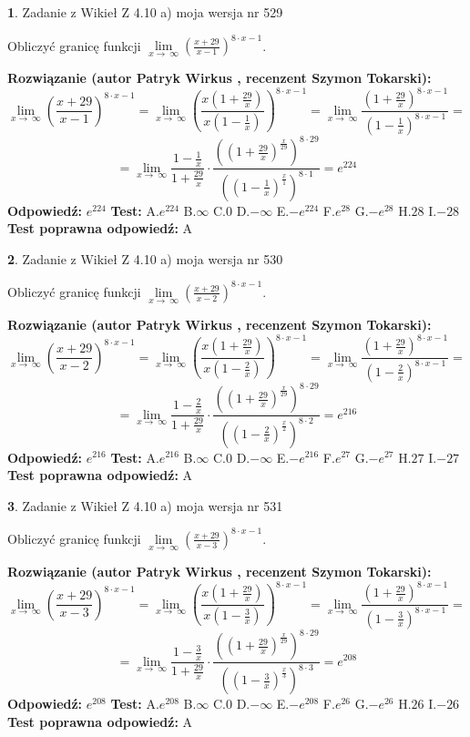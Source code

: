 \documentclass[12pt, a4paper]{article}
\theoremstyle{definition} %
\newtheorem{zad}{}
\newcommand{\zadStart}[1]{\begin{zad}#1\newline}
\newcommand{\zadStop}{\end{zad}}
\newcommand{\rozwStart}[2]{\noindent \textbf{Rozwiązanie (autor #1 , recenzent #2): }\newline}
\newcommand{\rozwStop}{\newline}
\newcommand{\odpStart}{\noindent \textbf{Odpowiedź:}\newline}
\newcommand{\odpStop}{\newline}
\newcommand{\testStart}{\noindent \textbf{Test:}\newline}
\newcommand{\testStop}{\newline}
\newcommand{\kluczStart}{\noindent \textbf{Test poprawna odpowiedź:}\newline}
\newcommand{\kluczStop}{\newline}
\begin{document}
\zadStart{Zadanie z Wikieł Z 4.10 a) moja wersja nr 529}

Obliczyć granicę funkcji  $\lim\limits_{x\to\ \infty}(\frac{x+29}{x-1})^{8\cdot x-1}$.
\zadStop
\rozwStart{Patryk Wirkus}{Szymon Tokarski}
$$\lim\limits_{x\to\ \infty}(\frac{x+29}{x-1})^{8\cdot x-1} = \lim\limits_{x\to\ \infty}(\frac{x(1+\frac{29}{x})}{x(1-\frac{1}{x})})^{8\cdot x-1}=\lim\limits_{x\to\ \infty}\frac{(1+\frac{29}{x})^{8\cdot x-1}}{(1-\frac{1}{x})^{8\cdot x-1}}=$$
$$=\lim\limits_{x\to\ \infty}\frac{1-\frac{1}{x}}{1+\frac{29}{x}}\cdot\frac{((1+\frac{29}{x})^{\frac{x}{29}})^{8\cdot29}}{((1-\frac{1}{x})^{\frac{x}{1}})^{8\cdot1}}=e^{224}$$
\rozwStop
\odpStart
$e^{224}$
\odpStop
\testStart
A.$e^{224}$ B.$\infty$ C.$0$ D.$-\infty$ E.$-e^{224}$
F.$e^{28}$ G.$-e^{28}$
H.$28$
I.$-28$
\testStop
\kluczStart
A
\kluczStop



\zadStart{Zadanie z Wikieł Z 4.10 a) moja wersja nr 530}

Obliczyć granicę funkcji  $\lim\limits_{x\to\ \infty}(\frac{x+29}{x-2})^{8\cdot x-1}$.
\zadStop
\rozwStart{Patryk Wirkus}{Szymon Tokarski}
$$\lim\limits_{x\to\ \infty}(\frac{x+29}{x-2})^{8\cdot x-1} = \lim\limits_{x\to\ \infty}(\frac{x(1+\frac{29}{x})}{x(1-\frac{2}{x})})^{8\cdot x-1}=\lim\limits_{x\to\ \infty}\frac{(1+\frac{29}{x})^{8\cdot x-1}}{(1-\frac{2}{x})^{8\cdot x-1}}=$$
$$=\lim\limits_{x\to\ \infty}\frac{1-\frac{2}{x}}{1+\frac{29}{x}}\cdot\frac{((1+\frac{29}{x})^{\frac{x}{29}})^{8\cdot29}}{((1-\frac{2}{x})^{\frac{x}{2}})^{8\cdot2}}=e^{216}$$
\rozwStop
\odpStart
$e^{216}$
\odpStop
\testStart
A.$e^{216}$ B.$\infty$ C.$0$ D.$-\infty$ E.$-e^{216}$
F.$e^{27}$ G.$-e^{27}$
H.$27$
I.$-27$
\testStop
\kluczStart
A
\kluczStop



\zadStart{Zadanie z Wikieł Z 4.10 a) moja wersja nr 531}

Obliczyć granicę funkcji  $\lim\limits_{x\to\ \infty}(\frac{x+29}{x-3})^{8\cdot x-1}$.
\zadStop
\rozwStart{Patryk Wirkus}{Szymon Tokarski}
$$\lim\limits_{x\to\ \infty}(\frac{x+29}{x-3})^{8\cdot x-1} = \lim\limits_{x\to\ \infty}(\frac{x(1+\frac{29}{x})}{x(1-\frac{3}{x})})^{8\cdot x-1}=\lim\limits_{x\to\ \infty}\frac{(1+\frac{29}{x})^{8\cdot x-1}}{(1-\frac{3}{x})^{8\cdot x-1}}=$$
$$=\lim\limits_{x\to\ \infty}\frac{1-\frac{3}{x}}{1+\frac{29}{x}}\cdot\frac{((1+\frac{29}{x})^{\frac{x}{29}})^{8\cdot29}}{((1-\frac{3}{x})^{\frac{x}{3}})^{8\cdot3}}=e^{208}$$
\rozwStop
\odpStart
$e^{208}$
\odpStop
\testStart
A.$e^{208}$ B.$\infty$ C.$0$ D.$-\infty$ E.$-e^{208}$
F.$e^{26}$ G.$-e^{26}$
H.$26$
I.$-26$
\testStop
\kluczStart
A
\kluczStop
\end{document}
